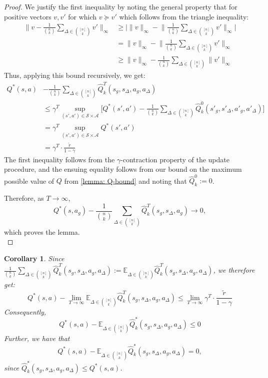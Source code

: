 \documentclass{article}
\theoremstyle{plain}
\newtheorem{corollary}[theorem]{Corollary}
\theoremstyle{definition}
\def\E{\mathbb{E}}
\begin{document}
\begin{proof}
We justify the first inequality by noting the general property that for positive vectors $v, v'$ for which $v\succeq v'$ which follows from the triangle inequality:
\begin{align*}\bigg\|v - \frac{1}{{n\choose k}}\sum_{\Delta\in{[n]\choose k}}v'\bigg\|_\infty &\geq \bigg|\|v\|_\infty - \bigg\|\frac{1}{{n\choose k}}\sum_{\Delta\in{[n]\choose k}}v'\bigg\|_\infty\bigg| \\
&= \|v\|_\infty - \bigg\|\frac{1}{{n\choose k}}\sum_{\Delta\in{[n]\choose k}}v'\bigg\|_\infty \\
&\geq \|v\|_\infty - \frac{1}{{n\choose k}}\sum_{\Delta\in{[n]\choose k}}\|v'\|_\infty\end{align*}
Thus, applying this bound recursively, we get:
\begin{align*}Q^*(s,a) &- \frac{1}{{n\choose k}}\sum_{\Delta\in {[n]\choose k}}\hat{Q}_k^T(s_g,s_\Delta,a_g,a_\Delta) \\ &\leq \gamma^{T} \sup_{(s', a') \in \mathcal{S}\times \mathcal{A}}\bigg[Q^*(s',a') - \frac{1}{{n\choose k}}\sum_{\Delta\in{[n]\choose k}}\hat{Q}_k^0(s'_g,s'_\Delta,a'_g,a'_\Delta)\bigg] \\
&= \gamma^{T} \sup_{(s', a') \in \mathcal{S}\times \mathcal{A}}Q^*(s',a') \\
&= \gamma^T\cdot \frac{\tilde{r}}{1-\gamma}
\end{align*}
\noindent The first inequality follows from the $\gamma$-contraction property of the update procedure, and the ensuing equality follows from our bound on the maximum possible value of $Q$ from \cref{lemma: Q-bound} and noting that $\hat{Q}_k^0 := 0$. 

Therefore, as $T\to\infty$, \[Q^*(s,a_g) - \frac{1}{{n\choose k}}\sum_{\Delta\in{[n]\choose k}}\hat{Q}_k^T(s_g,s_\Delta,a_g) \to 0,\] 
which proves the lemma.\qedhere  \\ \end{proof}

\begin{corollary}
    Since $\frac{1}{{n\choose k}}\sum_{\Delta\in{[n]\choose k}}\hat{Q}_k^T(s_g,s_\Delta,a_g,a_\Delta):=\E_{\Delta\in{[n]\choose k}}\hat{Q}_k^T(s_g,s_\Delta,a_g,a_\Delta)$, we therefore get:
\[Q^*(s,a) - \lim_{T\to\infty}\E_{\Delta\in{[n]\choose k}}\hat{Q}_k^T(s_g,s_\Delta,a_g,a_\Delta) \leq \lim_{T\to\infty}\gamma^T\cdot \frac{\tilde{r}}{1-\gamma}\]
Consequently,
\[Q^*(s,a) - \E_{\Delta\in{[n]\choose k}}\hat{Q}_k^*(s_g,s_\Delta,a_g,a_\Delta) \leq 0\]
Further, we have that
\[Q^*(s,a) - \E_{\Delta\in{[n]\choose k}}\hat{Q}_k^*(s_g,s_\Delta,a_g,a_\Delta) = 0,\]
since $\hat{Q}_k^*(s_g,s_\Delta,a_g,a_\Delta) \leq Q^*(s,a)$.\\
\end{corollary}
\end{document}

